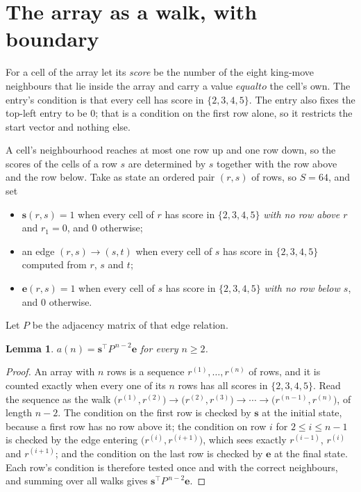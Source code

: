 \documentclass[11pt,a4paper]{article}
\theoremstyle{plain}
\newtheorem{lemma}[theorem]{Lemma}
\theoremstyle{definition}
\begin{document}
\section{The array as a walk, with boundary}

For a cell of the array let its \emph{score} be the number of the eight king-move neighbours that lie inside
the array and carry a value $equal to$ the cell's own. The entry's condition is that every cell
has score in $\{2,3,4,5\}$. The entry also fixes the top-left entry to be $0$; that is a condition on the first row alone, so it restricts the start vector and nothing else.

A cell's neighbourhood reaches at most one row up and one row down, so the scores of the
cells of a row $s$ are determined by $s$ together with the row above and the row below.
Take as state an ordered pair $(r,s)$ of rows, so $S=64$, and set
\begin{itemize}
\item $\mathbf{s}(r,s)=1$ when every cell of $r$ has score in $\{2,3,4,5\}$ \emph{with no row
above $r$} and $r_1=0$, and $0$ otherwise;
\item an edge $(r,s)\to(s,t)$ when every cell of $s$ has score in $\{2,3,4,5\}$ computed from
$r$, $s$ and $t$;
\item $\mathbf{e}(r,s)=1$ when every cell of $s$ has score in $\{2,3,4,5\}$ \emph{with no row
below $s$}, and $0$ otherwise.
\end{itemize}
Let $P$ be the adjacency matrix of that edge relation.

\begin{lemma}\label{lem:walk}
$a(n)=\mathbf{s}^{\!\top}P^{\,n-2}\mathbf{e}$ for every $n\ge2$.
\end{lemma}

\begin{proof}
An array with $n$ rows is a sequence $r^{(1)},\dots,r^{(n)}$ of rows, and it is counted
exactly when every one of its $n$ rows has all scores in $\{2,3,4,5\}$. Read the sequence as the
walk $\bigl(r^{(1)},r^{(2)}\bigr)\to\bigl(r^{(2)},r^{(3)}\bigr)\to\cdots\to
\bigl(r^{(n-1)},r^{(n)}\bigr)$, of length $n-2$. The condition on the first row is
checked by $\mathbf{s}$ at the initial state, because a first row has no row above it; the
condition on row $i$ for $2\le i\le n-1$ is checked by the edge entering
$\bigl(r^{(i)},r^{(i+1)}\bigr)$, which sees exactly $r^{(i-1)}$, $r^{(i)}$ and
$r^{(i+1)}$; and the condition on the last row is checked by $\mathbf{e}$ at the final
state. Each row's condition is therefore tested once and with the correct neighbours, and
summing over all walks gives $\mathbf{s}^{\!\top}P^{\,n-2}\mathbf{e}$.
\end{proof}
\end{document}
